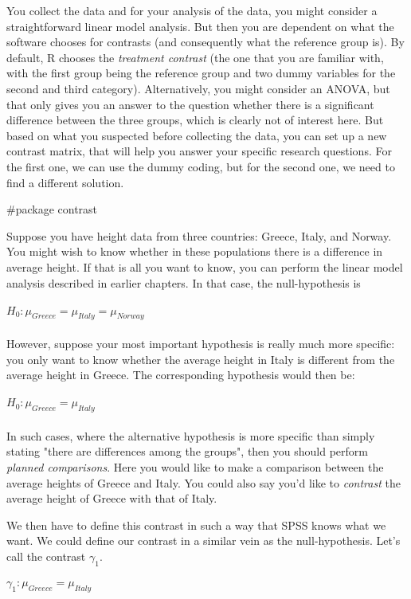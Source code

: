 You collect the data and for your analysis of the data, you might consider a straightforward linear model analysis. But then you are dependent on what the software chooses for contrasts (and consequently what the reference group is). By default, R chooses the \textit{treatment contrast} (the one that you are familiar with, with the first group being the reference group and two dummy variables for the second and third category). Alternatively, you might consider an ANOVA, but that only gives you an answer to the question whether there is a significant difference between the three groups, which is clearly not of interest here. But based on what you suspected before collecting the data, you can set up a new contrast matrix, that will help you answer your specific research questions. For the first one, we can use the dummy coding, but for the second one, we need to find a different solution. 


#package contrast

Suppose you have height data from three countries: Greece, Italy, and Norway. You might wish to know whether in these populations there is a difference in average height. If that is all you want to know, you can perform the linear model analysis described in earlier chapters. In that case, the null-hypothesis is
\\
\\
$H_0: \mu_{Greece}=\mu_{Italy}=\mu_{Norway}$
\\
\\
However, suppose your most important hypothesis is really much more specific: you only want to know whether the average height in Italy is different from the average height in Greece. The corresponding hypothesis would then be: 
\\
\\
$H_0: \mu_{Greece}=\mu_{Italy}$
\\
\\
In such cases, where the alternative hypothesis is more specific than simply stating "there are differences among the groups", then you should perform \textit{planned comparisons}. Here you would like to make a comparison between the average heights of Greece and Italy. You could also say you'd like to \textit{contrast} the average height of Greece with that of Italy. 

We then have to define this contrast in such a way that SPSS knows what we want. We could define our contrast in a similar vein as the null-hypothesis. Let's call the contrast $\gamma_1$.
\\
\\
$\gamma_1: \mu_{Greece}=\mu_{Italy}$
\\
\\


